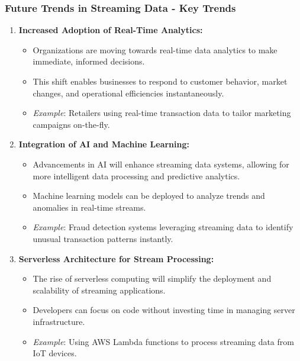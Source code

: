 \documentclass[aspectratio=169]{beamer}
\begin{document}
\begin{frame}[fragile]
    \frametitle{Future Trends in Streaming Data - Key Trends}
    \begin{enumerate}
        \item \textbf{Increased Adoption of Real-Time Analytics:}
            \begin{itemize}
                \item Organizations are moving towards real-time data analytics to make immediate, informed decisions.
                \item This shift enables businesses to respond to customer behavior, market changes, and operational efficiencies instantaneously.
                \item \textit{Example}: Retailers using real-time transaction data to tailor marketing campaigns on-the-fly.
            \end{itemize}
        
        \item \textbf{Integration of AI and Machine Learning:}
            \begin{itemize}
                \item Advancements in AI will enhance streaming data systems, allowing for more intelligent data processing and predictive analytics.
                \item Machine learning models can be deployed to analyze trends and anomalies in real-time streams.
                \item \textit{Example}: Fraud detection systems leveraging streaming data to identify unusual transaction patterns instantly.
            \end{itemize}
            
        \item \textbf{Serverless Architecture for Stream Processing:}
            \begin{itemize}
                \item The rise of serverless computing will simplify the deployment and scalability of streaming applications.
                \item Developers can focus on code without investing time in managing server infrastructure.
                \item \textit{Example}: Using AWS Lambda functions to process streaming data from IoT devices.
            \end{itemize}
    \end{enumerate}
\end{frame}
\end{document}
